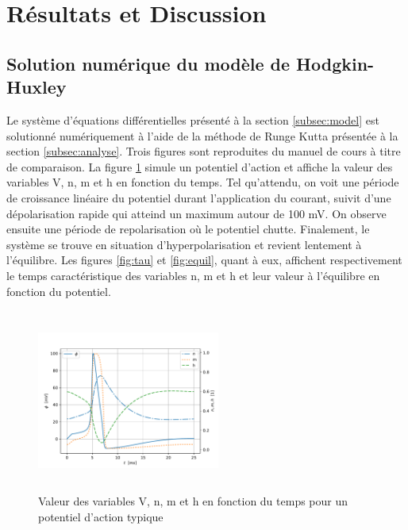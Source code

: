 \documentclass{article}
\begin{document}
\section{Résultats et Discussion}\label{sec:resultats}

\subsection{Solution numérique du modèle de Hodgkin-Huxley}\label{sec:solution_numerique}

Le système d'équations différentielles présenté à la section \ref{subsec:model} est solutionné numériquement à l'aide de la méthode de Runge Kutta présentée à la section \ref{subsec:analyse}. Trois figures sont reproduites du manuel de cours \cite{notes_cours} à titre de comparaison. La figure \ref{fig:vnmh} simule un potentiel d'action et affiche la valeur des variables V, n, m et h en fonction du temps. Tel qu'attendu, on voit une période de croissance linéaire du potentiel durant l'application du courant, suivit d'une dépolarisation rapide qui atteind un maximum autour de 100 mV. On observe ensuite une période de repolarisation où le potentiel chutte. Finalement, le système se trouve en situation d'hyperpolarisation et revient lentement à l'équilibre. Les figures \ref{fig:tau} et \ref{fig:equil}, quant à eux, affichent respectivement le temps caractéristique des variables n, m et h et leur valeur à l'équilibre en fonction du potentiel.

\begin{figure}[H]
	\includegraphics[width=6cm, height=6cm]{Vnmh.pdf}
	\centering
	\caption{Valeur des variables V, n, m et h en fonction du temps pour un potentiel d'action typique}
	\label{fig:vnmh}
\end{figure}
\end{document}
